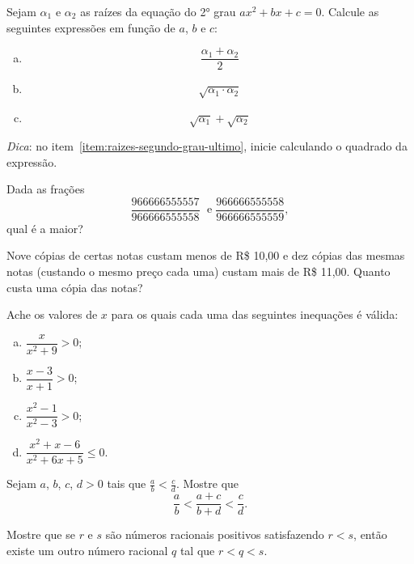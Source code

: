 \begin{exercise}
  Sejam $\alpha_1$ e $\alpha_2$ as raízes da equação do 2° grau $ax^2+bx+c=0$. Calcule
  as seguintes expressões em função de $a$, $b$ e $c$:
  \begin{enumerate}[a)]
    \item \[\frac{\alpha_1+\alpha_2}{2}\]
    \item \[\sqrt{\alpha_1\cdot\alpha_2}\]
    \item \label{item:raizes-segundo-grau-ultimo} \[\sqrt{\alpha_1}+\sqrt{\alpha_2}\]
  \end{enumerate}
  \textit{Dica}: no item~\ref{item:raizes-segundo-grau-ultimo}, inicie calculando o 
  quadrado da expressão.
\end{exercise}

\begin{exercise}
Dada as frações $$\frac{966666555557}{966666555558} \; \text{ e
} \; \frac{966666555558}{966666555559},$$ qual é a maior?
\end{exercise}


\begin{exercise}
Nove cópias de certas notas custam menos de R\$ 10,00 e dez
cópias das mesmas notas (custando o mesmo preço cada uma) custam
mais de R\$ 11,00. Quanto custa uma cópia das notas? 
\end{exercise}

\begin{exercise}
Ache os valores de $x$ para os quais cada uma das seguintes
inequações é válida:
\begin{enumerate}[a)]
  \item $\dfrac x {x^2+9} > 0$;
  \item $\dfrac{x-3}{x+1} > 0$;
  \item $\dfrac{x^2-1}{x^2-3} > 0$;
  \item $\dfrac{x^2+x-6}{x^2+6x+5} \leq 0$.
\end{enumerate}
\end{exercise}

\begin{exercise}
Sejam  $a$, $b$, $c$, $d > 0$ tais que $\frac a b < \frac c d$.
Mostre que $$\frac a b < \frac {a+c} {b+d} < \frac c d.$$
\end{exercise}

\begin{exercise}
  Mostre que se $r$ e $s$ são números racionais positivos satisfazendo $r < s$,
  então existe um outro número racional $q$ tal que $r<q<s$.
\end{exercise}

